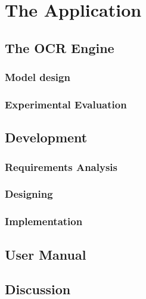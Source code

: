 \chapter{The Application}
\label{chap:application}
\section{The OCR Engine}
\subsection{Model design}
\subsection{Experimental Evaluation}
\section{Development}
\subsection{Requirements Analysis}
\subsection{Designing}
\subsection{Implementation}
\section{User Manual}
\label{sec:manual}
\section{Discussion}
